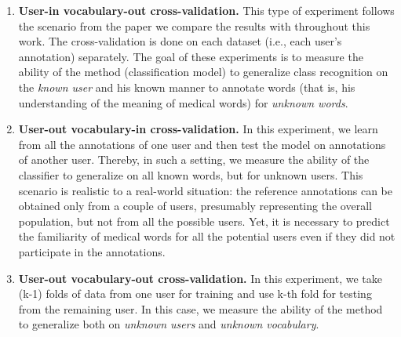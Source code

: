 \begin{enumerate}
    \item \textbf{User-in vocabulary-out cross-validation.} This type of experiment follows the scenario from the paper \citep{Grabar-PITR2014} we compare the results with throughout this work.  The cross-validation is done on each dataset (i.e., each user's annotation) separately. The goal of these experiments is to measure the ability of the method (classification model) to generalize class recognition on the \textit{known user} and his known manner to annotate words (that is, his understanding of the meaning of medical words) for \textit{unknown words}. 
    
    \item \textbf{User-out vocabulary-in cross-validation.} In this experiment, we learn from all the annotations of one user and then test the model on annotations of another user. Thereby, in such a setting, we measure the ability of the classifier to generalize on all known words, but for unknown users. This scenario is realistic to a real-world situation: the reference annotations can be obtained only from a couple of users, presumably representing the overall population, but not from all the possible users. Yet, it is necessary to predict the familiarity of medical words for all the potential users even if they did not participate in the annotations.
    
    \item \textbf{User-out vocabulary-out cross-validation.} In this experiment, we take (k-1) folds of data from one user for training and use k-th fold for testing from the remaining user. In this case, we measure the ability of the method to generalize both on \textit{unknown users} and \textit{ unknown vocabulary}.
\end{enumerate}